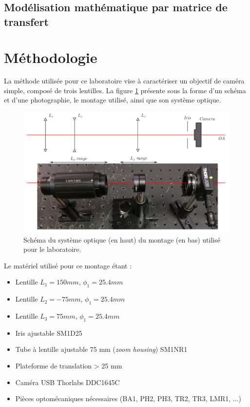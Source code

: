 \documentclass[11pt,letterpaper]{article}
\begin{document}

\subsection{Modélisation mathématique par matrice de transfert}

\section{Méthodologie}

La méthode utilisée pour ce laboratoire vise à caractériser un objectif de caméra simple, composé de trois lentilles. La figure \ref{montage} présente sous la forme d'un schéma et d'une photographie, le montage utilisé, ainsi que son système optique. 

\begin{figure}[H]
  \centering
  \includegraphics[scale=0.78]{Montage laboratoire 2.png}
  \caption{Schéma du système optique (en haut) du montage (en bas) utilisé pour le laboratoire.}
  \label{montage}
\end{figure}

Le matériel utilisé pour ce montage étant : 

\begin{itemize}
    \item Lentille $L_1 = 150 mm$, $\phi_1 = 25.4 mm$
    \item Lentille $L_2 = -75 mm$, $\phi_1 = 25.4 mm$
    \item Lentille $L_3 = 75 mm$, $\phi_1 = 25.4 mm$
    \item Iris ajustable SM1D25
    \item Tube à lentille ajustable 75 mm (\textit{zoom housing}) SM1NR1
    \item Plateforme de translation > 25 mm
    \item Caméra USB Thorlabs DDC1645C
    \item Pièces optomécaniques nécessaires (BA1, PH2, PH3, TR2, TR3, LMR1, ...)
\end{itemize}
\end{document}
